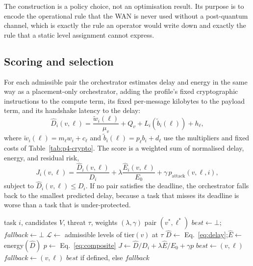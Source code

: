\documentclass[journal,10pt]{IEEEtran}
\begin{document}
The construction is a policy choice, not an optimisation result. Its purpose is
to encode the operational rule that the WAN is never used without a
post-quantum channel, which is exactly the rule an operator would write down
and exactly the rule that a static level assignment cannot express.

\subsection{Scoring and selection}
For each admissible pair the orchestrator estimates delay and energy in the
same way as a placement-only orchestrator, adding the profile's fixed
cryptographic instructions to the compute term, its fixed per-message kilobytes
to the payload term, and its handshake latency to the delay:
\begin{equation}
\hat D_i(v,\ell)=\frac{\tilde w_i(\ell)}{\mu_v}+Q_v+L_i(\tilde b_i(\ell))+h_\ell,
\label{eq:delay}
\end{equation}
where $\tilde w_i(\ell)=m_\ell w_i+c_\ell$ and
$\tilde b_i(\ell)=p_\ell b_i+d_\ell$ use the multipliers and fixed costs of
Table~\ref{tab:p4-crypto}. The score is a weighted sum of normalised delay,
energy, and residual risk,
\begin{equation}
J_i(v,\ell)=\frac{\hat D_i(v,\ell)}{D_i}+\lambda\frac{\hat E_i(v,\ell)}{E_0}
+\gamma\,p_{\text{attack}}(v,\ell,i),
\label{eq:score}
\end{equation}
subject to $\hat D_i(v,\ell)\le D_i$. If no pair satisfies the deadline, the
orchestrator falls back to the smallest predicted delay, because a task that
misses its deadline is worse than a task that is under-protected.

\begin{algorithm}[t]
\caption{Adaptive security-level and placement selection}
\label{alg:adaptive}
\begin{algorithmic}[1]
\Require task $i$, candidates $V$, threat $\tau$, weights $(\lambda,\gamma)$
\Ensure pair $(v^\ast,\ell^\ast)$
\State $best\gets\bot$;\quad $fallback\gets\bot$
  \State $\mathcal{L}\gets$ admissible levels of tier$(v)$ at $\tau$
    \State $\hat D\gets$ Eq.~\eqref{eq:delay};\quad $\hat E\gets$ energy$(\hat D)$
    \State $p\gets$ Eq.~\eqref{eq:composite}
    \State $J\gets\hat D/D_i+\lambda\hat E/E_0+\gamma p$
     $best\gets(v,\ell)$ \EndIf
     $fallback\gets(v,\ell)$ \EndIf
  \EndFor
\EndFor
\State \Return $best$ if defined, else $fallback$
\end{algorithmic}
\end{algorithm}
\end{document}
